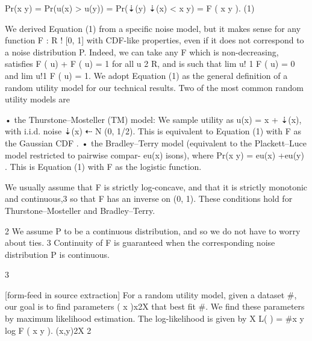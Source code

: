 \documentclass[10pt]{article}
\begin{document}
\begin{ReviewVerbatim}
              Pr(x     y) = Pr(u(x) > u(y)) = Pr(⇣(y)           ⇣(x) <    x      y) = F ( x        y ).   (1)

We derived Equation (1) from a specific noise model, but it makes sense for any function F : R !
[0, 1] with CDF-like properties, even if it does not correspond to a noise distribution P. Indeed, we
can take any F which is non-decreasing, satisfies F ( u) + F (        u) = 1 for all u 2 R, and is
such that lim u! 1 F ( u) = 0 and lim u!1 F ( u) = 1. We adopt Equation (1) as the general
definition of a random utility model for our technical results.
Two of the most common random utility models are

    • the Thurstone–Mosteller (TM) model: We sample utility as u(x) = x + ⇣(x), with i.i.d. noise
      ⇣(x) ⇠ N (0, 1/2). This is equivalent to Equation (1) with F as the Gaussian CDF .
    • the Bradley–Terry model (equivalent to the Plackett–Luce model restricted to pairwise compar-
                                    eu(x)
      isons), where Pr(x y) = eu(x)   +eu(y)
                                             . This is Equation (1) with F as the logistic function.

We usually assume that F is strictly log-concave, and that it is strictly monotonic and continuous,3 so
that F has an inverse on (0, 1). These conditions hold for Thurstone–Mosteller and Bradley–Terry.

    2
        We assume P to be a continuous distribution, and so we do not have to worry about ties.
    3
        Continuity of F is guaranteed when the corresponding noise distribution P is continuous.


                                                         3

[form-feed in source extraction]
For a random utility model, given a dataset #, our goal is to find parameters ( x )x2X that best fit #.
We find these parameters by maximum likelihood estimation. The log-likelihood is given by
                                      X
                           L( ) =            #{x y} log F ( x          y ).
                                     (x,y)2X 2


\end{ReviewVerbatim}
\end{document}
